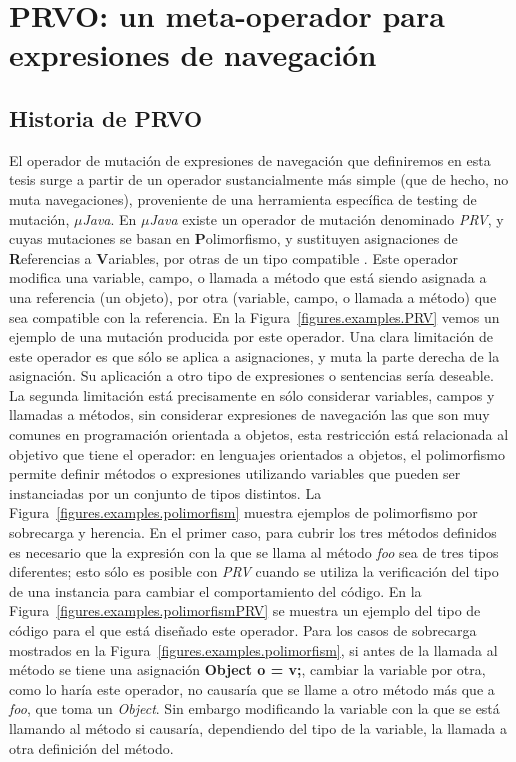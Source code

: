 \chapter[PRVO]{PRVO: un meta-operador para expresiones de navegaci\'on}
\label{cap:prvo}

\section{Historia de PRVO}
\label{sec:prvo.history}
El operador de mutaci\'on de expresiones de navegaci\'on que definiremos en esta tesis surge a partir de un operador sustancialmente m\'as simple (que de hecho, no muta navegaciones), proveniente de una herramienta espec\'ifica de testing de mutaci\'on, \emph{$\mu$Java}. En \emph{$\mu$Java} existe un operador de mutaci\'on denominado \emph{PRV}, y cuyas mutaciones se basan en \textbf{P}olimorfismo, y sustituyen asignaciones de \textbf{R}eferencias a \textbf{V}ariables, por otras de un tipo compatible \cite{muJavaCOPS, bibliography.mutation.operators.MaKO02}. Este operador modifica una variable, campo, o llamada a método que est\'a siendo asignada a una referencia (un objeto), por otra (variable, campo, o llamada a método) que sea compatible con la referencia. En la Figura~\ref{figures.examples.PRV} vemos un ejemplo de una mutaci\'on producida por este operador. Una clara limitaci\'on de este operador es que s\'olo se aplica a asignaciones, y muta la parte derecha de la asignaci\'on. Su aplicaci\'on a otro tipo de expresiones o sentencias ser\'ia deseable. La segunda limitaci\'on est\'a precisamente en s\'olo considerar variables, campos y llamadas a métodos, sin considerar expresiones de navegaci\'on las que son muy comunes en programaci\'on orientada a objetos, esta restricci\'on est\'a relacionada al objetivo que tiene el operador: en lenguajes orientados a objetos, el polimorfismo permite definir m\'etodos o expresiones utilizando variables que pueden ser instanciadas por un conjunto de tipos distintos. La Figura~\ref{figures.examples.polimorfism} muestra ejemplos de polimorfismo por sobrecarga y herencia. En el primer caso, para cubrir los tres m\'etodos definidos es necesario que la expresi\'on con la que se llama al m\'etodo \emph{foo} sea de tres tipos diferentes; esto s\'olo es posible con \emph{PRV} cuando se utiliza la verificaci\'on del tipo de una instancia para cambiar el comportamiento del c\'odigo. En la Figura~\ref{figures.examples.polimorfismPRV} se muestra un ejemplo del tipo de c\'odigo para el que est\'a dise\~nado este operador. Para los casos de sobrecarga mostrados en la Figura~\ref{figures.examples.polimorfism}, si antes de la llamada al m\'etodo se tiene una asignaci\'on \textbf{Object o = v;}, cambiar la variable por otra, como lo har\'ia este operador, no causar\'ia que se llame a otro m\'etodo m\'as que a \emph{foo}, que toma un \emph{Object}. Sin embargo modificando la variable con la que se est\'a llamando al m\'etodo si causar\'ia, dependiendo del tipo de la variable, la llamada a otra definici\'on del m\'etodo. 

